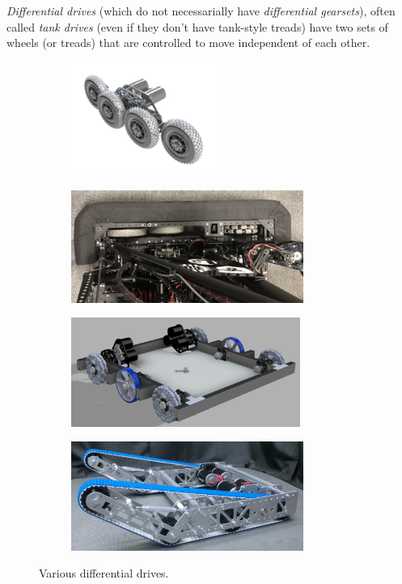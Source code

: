 \textit{Differential drives} (which do not necessarially have \textit{differential gearsets}), often called \textit{tank drives} (even if they don't have tank-style treads) have two sets of wheels (or treads) that are controlled to move independent of each other.

\begin{figure}[H]
\begin{subfigure}[b]{.3\linewidth}
	\includegraphics[height=1.45in]{imgs/drivetrain_pneumatic.png}
\end{subfigure}\begin{subfigure}[b]{.6\linewidth}
	\includegraphics[height=1.45in]{imgs/drivetrain_148_2018.jpeg}
\end{subfigure}

\begin{subfigure}[b]{.45\linewidth}
	\includegraphics[height=1.4in]{imgs/drivetrain_corneromni.png}
\end{subfigure}\begin{subfigure}[b]{.45\linewidth}
	\includegraphics[height=1.4in]{imgs/drivetrain_tank.png}
\end{subfigure}
\caption{Various differential drives.}
\end{figure}

